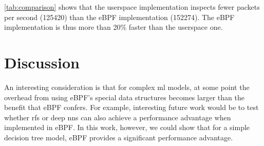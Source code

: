 \documentclass[conference]{IEEEtran}
\begin{document}
\autoref{tab:comparison} shows that the userspace implementation inspects fewer packets per second (125420) than the eBPF implementation (152274). The eBPF implementation is thus more than 20\% faster than the userspace one. 

\section{Discussion}

An interesting consideration is that for complex \gls{ml} models, at some point the overhead from using eBPF's special data structures becomes larger than the benefit that eBPF confers. For example, interesting future work would be to test whether \glspl{rf} or deep \glspl{nn} can also achieve a performance advantage when implemented in eBPF. In this work, however, we could show that for a simple decision tree model, eBPF provides a significant performance advantage. 


\renewcommand*{\bibfont}{\small}


\end{document}
